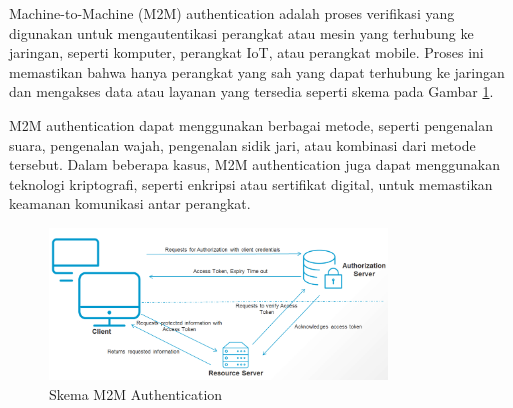 Machine-to-Machine (M2M) authentication adalah proses verifikasi yang digunakan untuk mengautentikasi perangkat atau mesin yang terhubung ke jaringan, seperti komputer, perangkat IoT, atau perangkat mobile. Proses ini memastikan bahwa hanya perangkat yang sah yang dapat terhubung ke jaringan dan mengakses data atau layanan yang tersedia seperti skema pada Gambar \ref*{fig:m2m}.

M2M authentication dapat menggunakan berbagai metode, seperti pengenalan suara, pengenalan wajah, pengenalan sidik jari, atau kombinasi dari metode tersebut. Dalam beberapa kasus, M2M authentication juga dapat menggunakan teknologi kriptografi, seperti enkripsi atau sertifikat digital, untuk memastikan keamanan komunikasi antar perangkat.

\begin{figure}
    \centering
    \includegraphics[width=0.8\textwidth]{BAB_TESIS/IMAGES/m2m_auth.png}
    \caption{Skema M2M Authentication}
    \label{fig:m2m}
\end{figure}